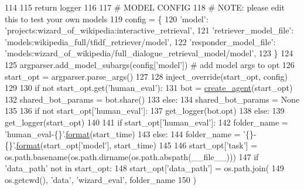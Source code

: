 \begin{DoxyCode}
{{{{114 
115         \textcolor{keywordflow}{return} logger
116 
117     \textcolor{comment}{# MODEL CONFIG}
118     \textcolor{comment}{# NOTE: please edit this to test your own models}
119     config = \{
120         \textcolor{stringliteral}{'model'}: \textcolor{stringliteral}{'projects:wizard\_of\_wikipedia:interactive\_retrieval'},
121         \textcolor{stringliteral}{'retriever\_model\_file'}: \textcolor{stringliteral}{'models:wikipedia\_full/tfidf\_retriever/model'},
122         \textcolor{stringliteral}{'responder\_model\_file'}: \textcolor{stringliteral}{'models:wizard\_of\_wikipedia/full\_dialogue\_retrieval\_model/model'},
123     \}
124 
125     argparser.add\_model\_subargs(config[\textcolor{stringliteral}{'model'}])  \textcolor{comment}{# add model args to opt}
126     start\_opt = argparser.parse\_args()
127 
128     inject\_override(start\_opt, config)
129 
130     \textcolor{keywordflow}{if} \textcolor{keywordflow}{not} start\_opt.get(\textcolor{stringliteral}{'human\_eval'}):
131         bot = \hyperlink{namespaceparlai_1_1core_1_1agents_ad0d54074d4bcc148bb415ab5515a53b5}{create\_agent}(start\_opt)
132         shared\_bot\_params = bot.share()
133     \textcolor{keywordflow}{else}:
134         shared\_bot\_params = \textcolor{keywordtype}{None}
135 
136     \textcolor{keywordflow}{if} \textcolor{keywordflow}{not} start\_opt[\textcolor{stringliteral}{'human\_eval'}]:
137         get\_logger(bot.opt)
138     \textcolor{keywordflow}{else}:
139         get\_logger(start\_opt)
140 
141     \textcolor{keywordflow}{if} start\_opt[\textcolor{stringliteral}{'human\_eval'}]:
142         folder\_name = \textcolor{stringliteral}{'human\_eval-\{\}'}.\hyperlink{namespaceparlai_1_1chat__service_1_1services_1_1messenger_1_1shared__utils_a32e2e2022b824fbaf80c747160b52a76}{format}(start\_time)
143     \textcolor{keywordflow}{else}:
144         folder\_name = \textcolor{stringliteral}{'\{\}-\{\}'}.\hyperlink{namespaceparlai_1_1chat__service_1_1services_1_1messenger_1_1shared__utils_a32e2e2022b824fbaf80c747160b52a76}{format}(start\_opt[\textcolor{stringliteral}{'model'}], start\_time)
145 
146     start\_opt[\textcolor{stringliteral}{'task'}] = os.path.basename(os.path.dirname(os.path.abspath(\_\_file\_\_)))
147     \textcolor{keywordflow}{if} \textcolor{stringliteral}{'data\_path'} \textcolor{keywordflow}{not} \textcolor{keywordflow}{in} start\_opt:
148         start\_opt[\textcolor{stringliteral}{'data\_path'}] = os.path.join(
149             os.getcwd(), \textcolor{stringliteral}{'data'}, \textcolor{stringliteral}{'wizard\_eval'}, folder\_name
150         )
}}}}
\end{DoxyCode}
